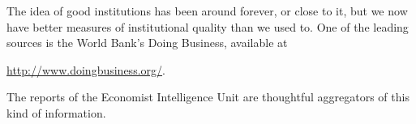 The idea of good institutions has been around forever, or close to it,
but we now have better measures of institutional quality than we used to.
One of the leading sources is the World Bank's Doing Business, available at

\vspace*{\parskip}
\centerline{\url{http://www.doingbusiness.org/}.}

The reports of the Economist Intelligence Unit are thoughtful aggregators
of this kind of information.
